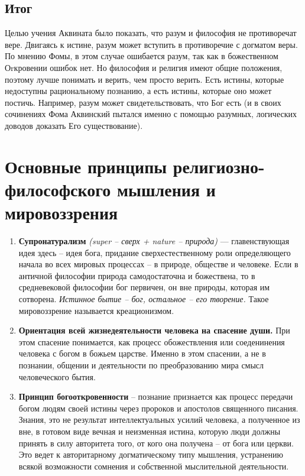 \documentclass[a4paper, 14pt]{extreport}
\begin{document}
\subsection{Итог}

Целью учения Аквината было показать, что разум и философия не
противоречат вере. Двигаясь к истине, разум может вступить в
противоречие с догматом веры. По мнению Фомы, в этом случае ошибается
разум, так как в божественном Оrкровении ошибок нет. Но философия и
религия имеют общие положения, поэтому лучше понимать и верить, чем
просто верить. Есть истины, которые недоступны рациональному познанию, а
есть истины, которые оно может постичь. Например, разум может
свидетельствовать, что Бог есть (и в своих сочинениях Фома Аквинский
пытался именно с помощью разумных, логических доводов доказать Его
существование).

\section{Основные принципы религиозно-философского мышления и
мировоззрения}

\begin{enumerate}
\def\labelenumi{\arabic{enumi}.}
\item
  \textbf{Супронатурализм} \emph{(super -- сверх + nature -- природа)}
  --- главенствующая идея здесь -- идея бога, придание
  сверхестественному роли определяющего начала во всех мировых процессах
  -- в природе, обществе и человеке. Если в античной философии природа
  самодостаточна и божествена, то в средневековой философии бог
  первичен, он вне природы, которая им сотворена. \emph{Истинное бытие
  -- бог, остальное -- его творение.} Такое мировоззрение называется
  креационизмом.
\item
  \textbf{Ориентация всей жизнедеятельности человека на спасение души.}
  При этом спасение понимается, как процесс обожествления или
  соеденинения человека с богом в божьем царстве. Именно в этом
  спасении, а не в познании, общении и деятельности по преобразованию
  мира смысл человеческого бытия.
\item
  \textbf{Принцип богооткровенности} -- познание признается как процесс
  передачи богом людям своей истины через пророков и апостолов
  священного писания. Знания, это не результат интеллектуальных усилий
  человека, а полученное из вне, в готовом виде вечная и неизменная
  истина, которую люди должны принять в силу авторитета того, от кого
  она получена -- от бога или церкви. Это ведет к авторитарному
  догматическому типу мышления, устранению всякой возможности сомнения и
  собственной мыслительной деятельности.
\end{enumerate}
\end{document}
